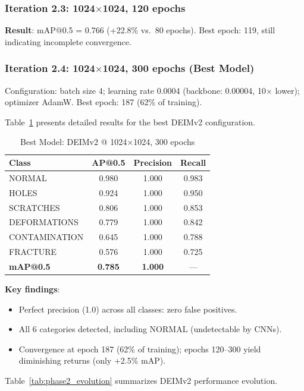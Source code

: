 \documentclass[journal,twoside,web]{ieeecolor}
\begin{document}
\subsubsection{Iteration 2.3: 1024$\times$1024, 120 epochs}
\textbf{Result}: mAP@0.5 = 0.766 (+22.8\% vs.\ 80 epochs). Best epoch: 119, still indicating incomplete convergence.

\subsubsection{Iteration 2.4: 1024$\times$1024, 300 epochs (Best Model)}
Configuration: batch size 4; learning rate 0.0004 (backbone: 0.00004, 10$\times$ lower); optimizer AdamW. Best epoch: 187 (62\% of training).

Table~\ref{tab:phase2_best} presents detailed results for the best DEIMv2 configuration.

\begin{table}[htbp]
\centering
\caption{Best Model: DEIMv2 @ 1024$\times$1024, 300 epochs}
\label{tab:phase2_best}
\begin{tabular}{lccc}
\toprule
\textbf{Class} & \textbf{AP@0.5} & \textbf{Precision} & \textbf{Recall} \\
\midrule
NORMAL & 0.980 & 1.000 & 0.983 \\
HOLES & 0.924 & 1.000 & 0.950 \\
SCRATCHES & 0.806 & 1.000 & 0.853 \\
DEFORMATIONS & 0.779 & 1.000 & 0.842 \\
CONTAMINATION & 0.645 & 1.000 & 0.788 \\
FRACTURE & 0.576 & 1.000 & 0.725 \\
\midrule
\textbf{mAP@0.5} & \textbf{0.785} & \textbf{1.000} & --- \\
\bottomrule
\end{tabular}
\end{table}

\textbf{Key findings}:
\begin{itemize}
    \item Perfect precision (1.0) across all classes: zero false positives.
    \item All 6 categories detected, including NORMAL (undetectable by CNNs).
    \item Convergence at epoch 187 (62\% of training); epochs 120--300 yield diminishing returns (only +2.5\% mAP).
\end{itemize}

Table~\ref{tab:phase2_evolution} summarizes DEIMv2 performance evolution.
\end{document}
